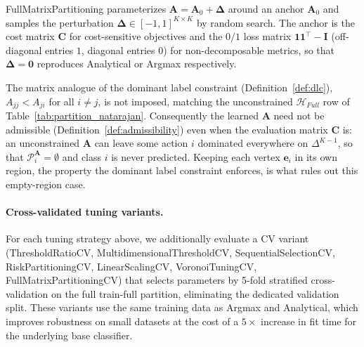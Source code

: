 FullMatrixPartitioning parameterizes $\mathbf{A} = \mathbf{A}_0 + \boldsymbol{\Delta}$ around an anchor $\mathbf{A}_0$ and samples the perturbation $\boldsymbol{\Delta} \in [-1, 1]^{K \times K}$ by random search. The anchor is the cost matrix $\mathbf{C}$ for cost-sensitive objectives and the $0/1$ loss matrix $\mathbf{1}\mathbf{1}^\top - \mathbf{I}$ (off-diagonal entries $1$, diagonal entries $0$) for non-decomposable metrics, so that $\boldsymbol{\Delta} = \mathbf{0}$ reproduces Analytical or Argmax respectively.

The matrix analogue of the dominant label constraint (Definition~\ref{def:dlc}), $A_{jj} < A_{ji}$ for all $i \neq j$, is not imposed, matching the unconstrained $\mathcal{H}_{Full}$ row of Table~\ref{tab:partition_natarajan}. Consequently the learned $\mathbf{A}$ need not be admissible (Definition~\ref{def:admissibility}) even when the evaluation matrix $\mathbf{C}$ is: an unconstrained $\mathbf{A}$ can leave some action $i$ dominated everywhere on $\Delta^{K-1}$, so that $\mathcal{P}_i^{\mathbf{A}} = \emptyset$ and class $i$ is never predicted. Keeping each vertex $\mathbf{e}_i$ in its own region, the property the dominant label constraint enforces, is what rules out this empty-region case.

\paragraph{Cross-validated tuning variants.} For each tuning strategy above, we additionally evaluate a CV variant (ThresholdRatioCV, MultidimensionalThresholdCV, SequentialSelectionCV, RiskPartitioningCV, LinearScalingCV, VoronoiTuningCV, FullMatrixPartitioningCV) that selects parameters by 5-fold stratified cross-validation on the full train-full partition, eliminating the dedicated validation split. These variants use the same training data as Argmax and Analytical, which improves robustness on small datasets at the cost of a $5\times$ increase in fit time for the underlying base classifier.

